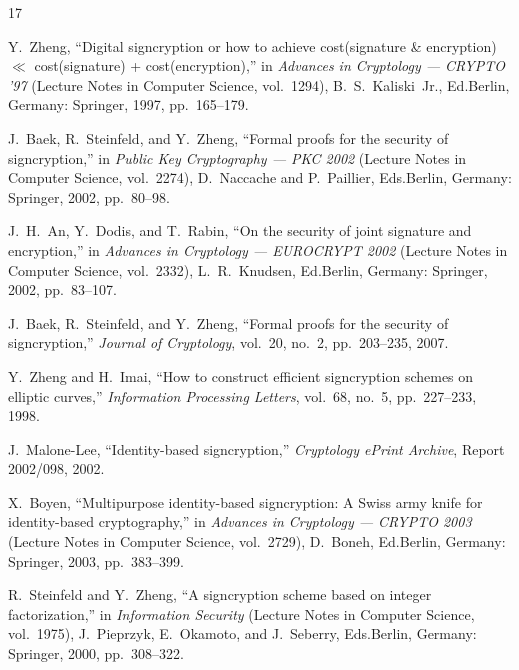 \documentclass[conference]{IEEEtran}
\begin{document}
\begin{thebibliography}{17}

Y.~Zheng, ``Digital signcryption or how to achieve cost(signature \& encryption) $\ll$ cost(signature) + cost(encryption),'' in \textit{Advances in Cryptology --- CRYPTO '97} (Lecture Notes in Computer Science, vol.~1294), B.~S.~Kaliski~Jr., Ed.\hspace{1em}Berlin, Germany: Springer, 1997, pp.~165--179.

J.~Baek, R.~Steinfeld, and Y.~Zheng, ``Formal proofs for the security of signcryption,'' in \textit{Public Key Cryptography --- PKC 2002} (Lecture Notes in Computer Science, vol.~2274), D.~Naccache and P.~Paillier, Eds.\hspace{1em}Berlin, Germany: Springer, 2002, pp.~80--98.

J.~H.~An, Y.~Dodis, and T.~Rabin, ``On the security of joint signature and encryption,'' in \textit{Advances in Cryptology --- EUROCRYPT 2002} (Lecture Notes in Computer Science, vol.~2332), L.~R.~Knudsen, Ed.\hspace{1em}Berlin, Germany: Springer, 2002, pp.~83--107.

J.~Baek, R.~Steinfeld, and Y.~Zheng, ``Formal proofs for the security of signcryption,'' \textit{Journal of Cryptology}, vol.~20, no.~2, pp.~203--235, 2007.

Y.~Zheng and H.~Imai, ``How to construct efficient signcryption schemes on elliptic curves,'' \textit{Information Processing Letters}, vol.~68, no.~5, pp.~227--233, 1998.

J.~Malone-Lee, ``Identity-based signcryption,'' \textit{Cryptology ePrint Archive}, Report 2002/098, 2002.

X.~Boyen, ``Multipurpose identity-based signcryption: A Swiss army knife for identity-based cryptography,'' in \textit{Advances in Cryptology --- CRYPTO 2003} (Lecture Notes in Computer Science, vol.~2729), D.~Boneh, Ed.\hspace{1em}Berlin, Germany: Springer, 2003, pp.~383--399.

R.~Steinfeld and Y.~Zheng, ``A signcryption scheme based on integer factorization,'' in \textit{Information Security} (Lecture Notes in Computer Science, vol.~1975), J.~Pieprzyk, E.~Okamoto, and J.~Seberry, Eds.\hspace{1em}Berlin, Germany: Springer, 2000, pp.~308--322.


\end{thebibliography}
\end{document}
